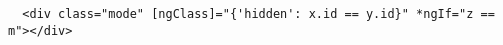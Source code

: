 \documentclass{article}
\begin{document}
  \makeatletter
  \def\dontdofcolorbox{\renewcommand\fcolorbox[4][]{##4}}
  \makeatother

  \begin{verbatim}
  <div class="mode" [ngClass]="{'hidden': x.id == y.id}" *ngIf="z == m"></div>
  \end{verbatim}
\end{document}
